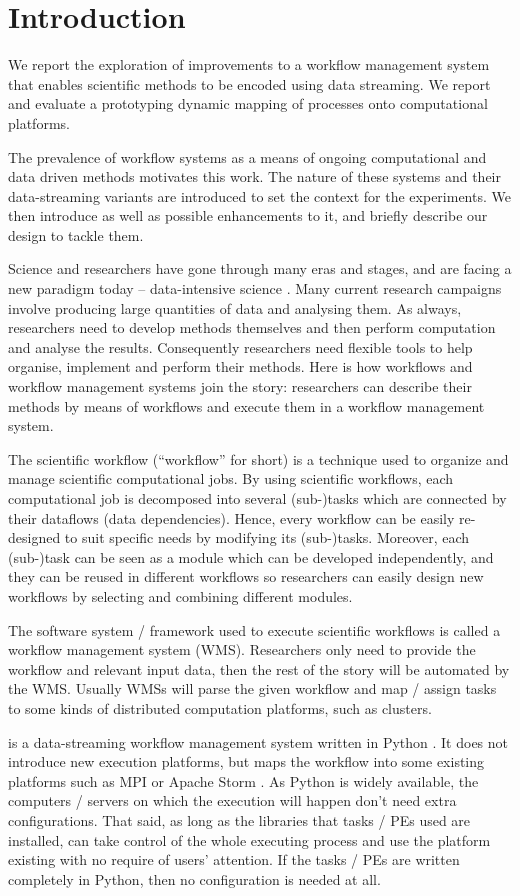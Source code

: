 \chapter{Introduction}
We report the exploration of improvements to a workflow management system that enables scientific methods to be encoded using data streaming. We report and evaluate a prototyping dynamic mapping of processes onto computational platforms.

The prevalence of workflow systems as a means of ongoing computational and data driven methods motivates this work. The nature of these systems and their data-streaming variants are introduced to set the context for the experiments. We then introduce \dpy as well as possible enhancements to it, and briefly describe our design to tackle them.

Science and researchers have gone through many eras and stages, and are facing a new paradigm today -- data-intensive science \cite{hey2009fourth}. Many current research campaigns involve producing large quantities of data and analysing them. As always, researchers need to develop methods themselves and then perform computation and analyse the results. Consequently researchers need flexible tools to help organise, implement and perform their methods. Here is how workflows and workflow management systems join the story: researchers can describe their methods by means of workflows and execute them in a workflow management system.

The scientific workflow (``workflow'' for short) is a technique used to organize and manage scientific computational jobs. By using scientific workflows, each computational job is decomposed into several (sub-)tasks which are connected by their dataflows (data dependencies). Hence, every workflow can be easily re-designed to suit specific needs by modifying its (sub-)tasks. Moreover, each (sub-)task can be seen as a module which can be developed independently, and they can be reused in different workflows so researchers can easily design new workflows by selecting and combining different modules.

The software system / framework used to execute scientific workflows is called a workflow management system (WMS). Researchers only need to provide the workflow and relevant input data, then the rest of the story will be automated by the WMS. Usually WMSs will parse the given workflow and map / assign tasks to some kinds of distributed computation platforms, such as clusters.

\Dpy is a data-streaming workflow management system written in Python \cite{doi:10.1177/1094342016649766}. It does not introduce new execution platforms, but maps the workflow into some existing platforms such as MPI \cite{MPI_forum} or Apache Storm \cite{apache_storm}. As Python is widely available, the computers / servers on which the execution will happen don't need extra configurations. That said, as long as the libraries that tasks / PEs used are installed, \dpy can take control of the whole executing process and use the platform existing with no require of users' attention. If the tasks / PEs are written completely in Python, then no configuration is needed at all.


